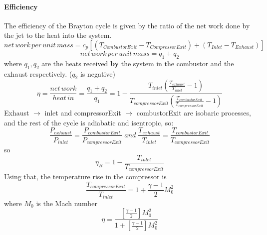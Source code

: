 \documentclass[12pt,onecolumn]{IEEEtran}
\begin{document}
\paragraph{Efficiency}
The efficiency of the Brayton cycle is given by the ratio of the net work done by the jet to the heat into the system.
\begin{equation}
net\, work\, per\, unit\, mass = c_p [(T_{CombustorExit}-T_{CompressorExit}) + (T_{Inlet}-T_{Exhaust})]
\end{equation}
\begin{equation}
net\,work\,per\,unit\,mass = q_1 + q_2
\end{equation}
where $q_1,q_2$ are the heats received \textbf{by} the system in the combustor and the exhaust respectively. ($q_2$ is negative)
\begin{equation}
\eta = \frac{net\,work}{heat\,in} = \frac{q_1 + q_2}{q_1} = 1-\frac{T_{inlet}(\frac{T_{exhaust}}{T_{inlet}}-1)}{T_{compressorExit}(\frac{T_{combustorExit}}{T_{compressorExit}}-1)}
\end{equation}
Exhaust $\rightarrow$ inlet and compressorExit $\rightarrow$ combustorExit are isobaric processes, and the rest of the cycle is adiabatic and isentropic, so:
\begin{equation}
\frac{P_{exhaust}}{P_{inlet}} = \frac{P_{combustorExit}}{P_{compressorExit}}\;and\; \frac{T_{exhaust}}{T_{inlet}} = \frac{T_{combustorExit}}{T_{compressorExit}}
\end{equation}
so
\begin{equation}
\eta_B = 1 - \frac{T_{inlet}}{T_{compressorExit}} \label{eq:5}
\end{equation}
Using that, the temperature rise in the compressor is
\begin{equation}
\frac{T_{compressorExit}}{T_{inlet}} = 1 + \frac{\gamma -1}{2}M_0^2
\end{equation}
where $M_0$ is the Mach number
\begin{equation}
\eta = \frac{[\frac{\gamma -1}{2}]M_0^2}{1+[\frac{\gamma -1}{2}]M_0^2}
\end{equation}
\end{document}
